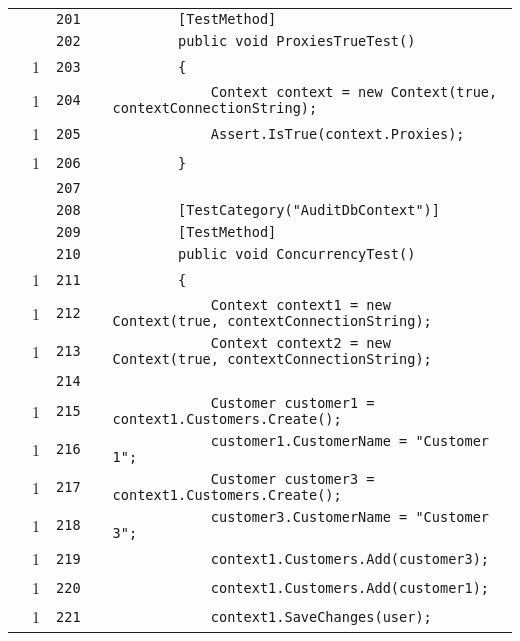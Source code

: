 \documentclass[a4paper,10pt]{article}
\begin{document}
\begin{longtable}[l]{lrrll}
\cellcolor{gray} &  & \verb~201~ & & \verb~        [TestMethod]~\\
\cellcolor{gray} &  & \verb~202~ & & \verb~        public void ProxiesTrueTest()~\\
\cellcolor{green} & 1 & \verb~203~ & & \verb~        {~\\
\cellcolor{green} & 1 & \verb~204~ & & \verb~            Context context = new Context(true, contextConnectionString);~\\
\cellcolor{green} & 1 & \verb~205~ & & \verb~            Assert.IsTrue(context.Proxies);~\\
\cellcolor{green} & 1 & \verb~206~ & & \verb~        }~\\
\cellcolor{gray} &  & \verb~207~ & & \verb~~\\
\cellcolor{gray} &  & \verb~208~ & & \verb~        [TestCategory("AuditDbContext")]~\\
\cellcolor{gray} &  & \verb~209~ & & \verb~        [TestMethod]~\\
\cellcolor{gray} &  & \verb~210~ & & \verb~        public void ConcurrencyTest()~\\
\cellcolor{green} & 1 & \verb~211~ & & \verb~        {~\\
\cellcolor{green} & 1 & \verb~212~ & & \verb~            Context context1 = new Context(true, contextConnectionString);~\\
\cellcolor{green} & 1 & \verb~213~ & & \verb~            Context context2 = new Context(true, contextConnectionString);~\\
\cellcolor{gray} &  & \verb~214~ & & \verb~~\\
\cellcolor{green} & 1 & \verb~215~ & & \verb~            Customer customer1 = context1.Customers.Create();~\\
\cellcolor{green} & 1 & \verb~216~ & & \verb~            customer1.CustomerName = "Customer 1";~\\
\cellcolor{green} & 1 & \verb~217~ & & \verb~            Customer customer3 = context1.Customers.Create();~\\
\cellcolor{green} & 1 & \verb~218~ & & \verb~            customer3.CustomerName = "Customer 3";~\\
\cellcolor{green} & 1 & \verb~219~ & & \verb~            context1.Customers.Add(customer3);~\\
\cellcolor{green} & 1 & \verb~220~ & & \verb~            context1.Customers.Add(customer1);~\\
\cellcolor{green} & 1 & \verb~221~ & & \verb~            context1.SaveChanges(user);~\\

\end{longtable}
\end{document}
